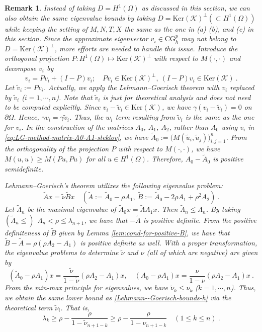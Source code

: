 \documentclass[a4,11pt]{article}
\numberwithin{equation}{section}
\newtheorem{remark}[theorem]{Remark}
\begin{document}
\begin{remark}
\label{remark:steklov-LM-method-new-setting}
 Instead of taking $D=H^1(\Omega)$ as discussed in this section, we can also obtain the same eigenvalue bounds by taking 
$ {D} = \mbox{Ker}(\mathcal{K})^\perp(\subset H^1(\Omega))$ while
keeping the setting of $M,N,T,X$ the same as the one in (a) (b), and (c) in this section. 
Since the approximate eigenvector $v_{i} \in \text{CG}^p_h$ may not belong to $D=\mbox{Ker}(\mathcal{K})^\perp$, more efforts are needed to handle this issue.
Introduce the orthogonal projection $P:H^1(\Omega) \mapsto {\mbox{Ker}(\mathcal{K})^\perp}$ with respect to $M(\cdot,\cdot)$ and decompose $v_i$ by 
$$
v_i = P v_i + (I-P) v_i;\quad 
P v_i\in \mbox{Ker}(\mathcal{K})^\perp,~
(I-P) v_i \in \mbox{Ker}(\mathcal{K})~.
$$
Let $\tilde{v}_i := P v_i$.
Actually, we apply the Lehmann--Goerisch theorem with $v_i$ replaced by $\tilde{v}_i$ ($i=1,\cdots,n$). 
Note that  $\tilde{v}_i $ is just for theoretical analysis and does  not need to be computed explicitly.
%
Since $v_i-\tilde{v}_i \in \mbox{Ker}(\mathcal{K})$, we have $\gamma (v_i-\tilde{v}_i)=0$ on $\partial \Omega$. Hence, $\gamma v_i = \gamma \tilde{v}_i $. Thus, the $w_i$ term resulting from $\tilde{v}_i$ is the same as the one for $v_i$. In the construction of the matrices $A_0$, $A_1$, $A_2$, rather than 
$A_0$ using $v_i$ in \eqref{eq:LG-method-matrix-A0-A1-steklov}, we have $
\widetilde{A}_0 := \big(M( \tilde{u}_{i}, \tilde{u}_{j}) \big)_{i,j=1}^n$. From the orthogonality of the projection $P$ with respect to $M(\cdot,\cdot)$, we have $M(u,u)  \ge M(Pu, Pu) $ for all $u \in H^1(\Omega)$. Therefore, $A_0 - \widetilde{A}_0$ is positive semidefinite. 

Lehmann--Goerisch's theorem utilizes the following eigenvalue problem: 
$$
 \widetilde{A} x = \tilde{\nu} \widetilde{B} x \quad  (\widetilde{A} := \widetilde{A}_0 - \rho A_1, ~ \widetilde{B} := \widetilde{A}_0 - 2 \rho A_1 + \rho^2 A_2)~.
$$
%
Let $\widetilde{\Lambda}_n$ be the maximal eigenvalue of 
$\widetilde{A}_0 x = \widetilde{\Lambda} A_1 x$. Then
$\widetilde{\Lambda}_n \le \Lambda_n$.
%
By taking $(\widetilde{\Lambda}_n \le ) \: \: \Lambda_n <\rho \le \lambda_{n+1}$, 
we have that $-\widetilde{A}$ is positive definite. 
From the positive definiteness  of $\widetilde{B}$ given by Lemma \ref{lem:cond-for-positive-B}, we have that $\widetilde{B}-\widetilde{A} = \rho(\rho A_2-A_1)$ is positive definite as well.
With a proper transformation, the eigenvalue problems to determine $\tilde{\nu}$ and $\nu$ (all of which are negative) are given by
$$
(\widetilde{A}_0 - \rho A_1)x = \frac{\tilde{\nu}}{1-\tilde{\nu}} (\rho A_2 - A_1)x, \quad ({A}_0 - \rho A_1)x = \frac{{\nu}}{1-{\nu}} (\rho A_2 - A_1)x\:. 
$$
From the min-max principle for eigenvalues, we have 
$\tilde{\nu}_k \le \nu_k$ ($k=1,\cdots, n$).
Thus, we obtain the same lower bound as \cref{Lehmann--Goerisch-bounds-h}  via the  theoretical term $\tilde{\nu}_i$. That is, 
\begin{equation}\label{eq:steklov-Lehmann--Goerisch-bounds-h-from-new-setting}
\lambda_{k} \geq \rho - \frac{\rho}{1 - \tilde{\nu}_{n+1-k}} \ge \rho - \frac{\rho}{1 - {\nu}_{n+1-k}}  \quad (1\leq k\leq n)\:.
\end{equation}
	

\end{remark}
\end{document}
